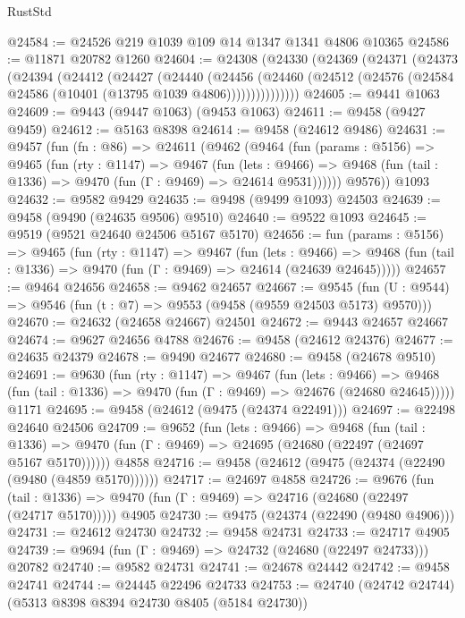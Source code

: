 \begin{lexlean}{RustStd}
\begin{coremodule}
@24584 := @24526 @219 @1039 @109 @14 @1347 @1341 @4806 @10365
@24586 := @11871 @20782 @1260
@24604 := @24308
    (@24330
      (@24369
        (@24371
          (@24373
            (@24394
              (@24412
                (@24427
                  (@24440
                    (@24456
                      (@24460
                        (@24512 (@24576 (@24584 @24586 (@10401 (@13795 @1039 @4806)))))))))))))))
@24605 := @9441 @1063
@24609 := @9443 (@9447 @1063) (@9453 @1063)
@24611 := @9458 (@9427 @9459)
@24612 := @5163 @8398
@24614 := @9458 (@24612 @9486)
@24631 := @9457
    (fun (fn : @86) =>
    @24611
      (@9462
        (@9464
          (fun (params : @5156) =>
          @9465
            (fun (rty : @1147) =>
            @9467
              (fun (lets : @9466) =>
              @9468 (fun (tail : @1336) => @9470 (fun (Γ : @9469) => @24614 @9531))))))
        @9576))
    @1093
@24632 := @9582 @9429
@24635 := @9498 (@9499 @1093) @24503
@24639 := @9458 (@9490 (@24635 @9506) @9510)
@24640 := @9522 @1093
@24645 := @9519 (@9521 @24640 @24506 @5167 @5170)
@24656 := fun (params : @5156) =>
  @9465
    (fun (rty : @1147) =>
    @9467
      (fun (lets : @9466) =>
      @9468 (fun (tail : @1336) => @9470 (fun (Γ : @9469) => @24614 (@24639 @24645)))))
@24657 := @9464 @24656
@24658 := @9462 @24657
@24667 := @9545
    (fun (U : @9544) => @9546 (fun (t : @7) => @9553 (@9458 (@9559 @24503 @5173) @9570)))
@24670 := @24632 (@24658 @24667) @24501
@24672 := @9443 @24657 @24667
@24674 := @9627 @24656 @4788
@24676 := @9458 (@24612 @24376)
@24677 := @24635 @24379
@24678 := @9490 @24677
@24680 := @9458 (@24678 @9510)
@24691 := @9630
    (fun (rty : @1147) =>
    @9467
      (fun (lets : @9466) =>
      @9468 (fun (tail : @1336) => @9470 (fun (Γ : @9469) => @24676 (@24680 @24645)))))
    @1171
@24695 := @9458 (@24612 (@9475 (@24374 @22491)))
@24697 := @22498 @24640 @24506
@24709 := @9652
    (fun (lets : @9466) =>
    @9468
      (fun (tail : @1336) =>
      @9470 (fun (Γ : @9469) => @24695 (@24680 (@22497 (@24697 @5167 @5170))))))
    @4858
@24716 := @9458 (@24612 (@9475 (@24374 (@22490 (@9480 (@4859 @5170))))))
@24717 := @24697 @4858
@24726 := @9676
    (fun (tail : @1336) => @9470 (fun (Γ : @9469) => @24716 (@24680 (@22497 (@24717 @5170)))))
    @4905
@24730 := @9475 (@24374 (@22490 (@9480 @4906)))
@24731 := @24612 @24730
@24732 := @9458 @24731
@24733 := @24717 @4905
@24739 := @9694 (fun (Γ : @9469) => @24732 (@24680 (@22497 @24733))) @20782
@24740 := @9582 @24731
@24741 := @24678 @24442
@24742 := @9458 @24741
@24744 := @24445 @22496 @24733
@24753 := @24740 (@24742 @24744) (@5313 @8398 @8394 @24730 @8405 (@5184 @24730))

\end{coremodule}
\end{lexlean}
